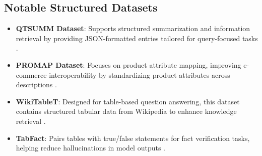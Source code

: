 \subsection{Notable Structured Datasets}
\begin{itemize}
    \item \textbf{QTSUMM Dataset}: Supports structured summarization and information retrieval by providing JSON-formatted entries tailored for query-focused tasks \citep{zhao2023qtsummqueryfocusedsummarizationtabular}.
    \item \textbf{PROMAP Dataset}: Focuses on product attribute mapping, improving e-commerce interoperability by standardizing product attributes across descriptions \citep{macková2023promapdatasetsproductmapping}.
    \item \textbf{WikiTableT}: Designed for table-based question answering, this dataset contains structured tabular data from Wikipedia to enhance knowledge retrieval \citep{chen2021wikitabletlargescaledatatotextdataset}.
    \item \textbf{TabFact}: Pairs tables with true/false statements for fact verification tasks, helping reduce hallucinations in model outputs \citep{chen2020tabfactlargescaledatasettablebased}.
\end{itemize}

